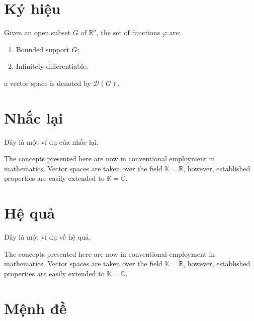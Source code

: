 \documentclass[11pt,fleqn]{book} %
\begin{document}

\section{Ký hiệu}

\begin{notation}
Given an open subset $G$ of $\mathbb{R}^n$, the set of functions $\varphi$ are:
\begin{enumerate}
\item Bounded support $G$;
\item Infinitely differentiable;
\end{enumerate}
a vector space is denoted by $\mathcal{D}(G)$. 
\end{notation}


\section{Nhắc lại}

Đây là một ví dụ của nhắc lại.

\begin{remark}
The concepts presented here are now in conventional employment in mathematics. Vector spaces are taken over the field $\mathbb{K}=\mathbb{R}$, however, established properties are easily extended to $\mathbb{K}=\mathbb{C}$.
\end{remark}


\section{Hệ quả}

Đây là một ví dụ về hệ quả.

\begin{corollary}
The concepts presented here are now in conventional employment in mathematics. Vector spaces are taken over the field $\mathbb{K}=\mathbb{R}$, however, established properties are easily extended to $\mathbb{K}=\mathbb{C}$.
\end{corollary}


\section{Mệnh đề}
\end{document}
